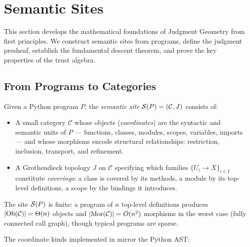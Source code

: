 
\section{Semantic Sites}\label{sec:sites}

This section develops the mathematical foundations of Judgment Geometry from
first principles.  We construct semantic sites from programs, define the
judgment presheaf, establish the fundamental descent theorem, and prove the
key properties of the trust algebra.

\subsection{From Programs to Categories}

\begin{definition}\label{def:site}
Given a Python program $P$, the \emph{semantic site} $\mathcal{S}(P) = (\mathcal{C}, J)$
consists of:
\begin{itemize}
  \item A small category $\mathcal{C}$ whose objects (\emph{coordinates})
        are the syntactic and semantic units of $P$ --- functions, classes,
        modules, scopes, variables, imports --- and whose morphisms encode
        structural relationships: restriction, inclusion, transport,
        and refinement.
  \item A Grothendieck topology $J$ on $\mathcal{C}$ specifying which families
        $\{U_i \to X\}_{i \in I}$ constitute \emph{coverings}: a class is
        covered by its methods, a module by its top-level definitions, a scope
        by the bindings it introduces.
\end{itemize}
\end{definition}

\begin{remark}
The site $\mathcal{S}(P)$ is finite: a program of $n$ top-level definitions
produces $|\mathrm{Ob}(\mathcal{C})| = \Theta(n)$ objects and
$|\mathrm{Mor}(\mathcal{C})| = O(n^2)$ morphisms in the worst case (fully
connected call graph), though typical programs are sparse.
\end{remark}

The coordinate kinds implemented in \JuGeo{} mirror the Python AST:

